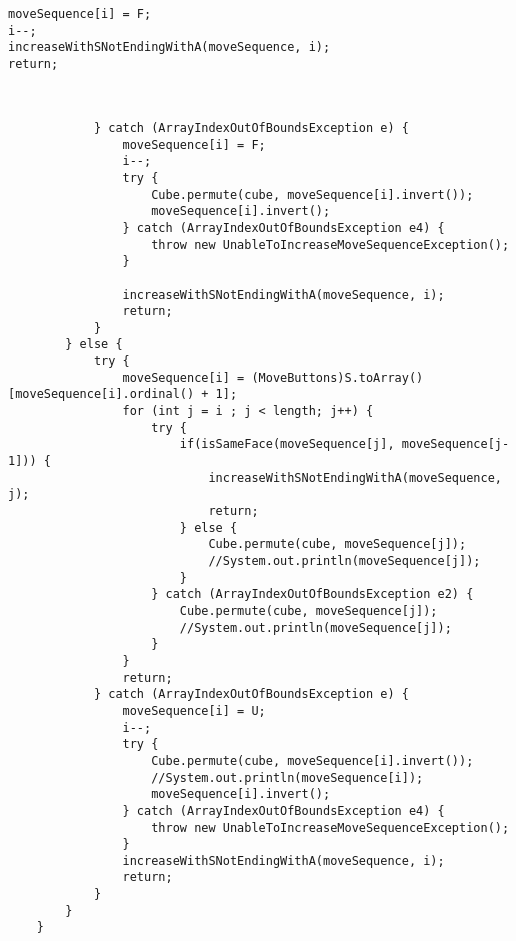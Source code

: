 \begin{verbatim}
moveSequence[i] = F;
i--;
increaseWithSNotEndingWithA(moveSequence, i);
return;
\end{verbatim}




\begin{verbatim}

		
			} catch (ArrayIndexOutOfBoundsException e) {
				moveSequence[i] = F;
				i--;
				try {
					Cube.permute(cube, moveSequence[i].invert());
					moveSequence[i].invert();
				} catch (ArrayIndexOutOfBoundsException e4) {
					throw new UnableToIncreaseMoveSequenceException();
				}

				increaseWithSNotEndingWithA(moveSequence, i);
				return;
			}
		} else {
			try {
				moveSequence[i] = (MoveButtons)S.toArray()[moveSequence[i].ordinal() + 1];
				for (int j = i ; j < length; j++) {
					try {
						if(isSameFace(moveSequence[j], moveSequence[j-1])) {
							increaseWithSNotEndingWithA(moveSequence, j);
							return;
						} else {
							Cube.permute(cube, moveSequence[j]);
							//System.out.println(moveSequence[j]);
						}
					} catch (ArrayIndexOutOfBoundsException e2) {
						Cube.permute(cube, moveSequence[j]);
						//System.out.println(moveSequence[j]);
					}
				}
				return; 
			} catch (ArrayIndexOutOfBoundsException e) {
				moveSequence[i] = U;
				i--;
				try {
					Cube.permute(cube, moveSequence[i].invert());
					//System.out.println(moveSequence[i]);
					moveSequence[i].invert();
				} catch (ArrayIndexOutOfBoundsException e4) {
					throw new UnableToIncreaseMoveSequenceException();
				}
				increaseWithSNotEndingWithA(moveSequence, i);
				return;
			}
		}
	}
	
\end{verbatim}
